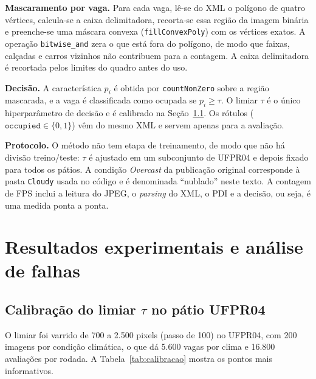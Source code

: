 \documentclass[
	article,			%
	11pt,				%
	oneside,			%
	a4paper,			%
	english,			%
	brazil,				%
	sumario=tradicional
	]{abntex2}
\begin{document}
\textbf{Mascaramento por vaga.} Para cada vaga, lê-se do XML o polígono de quatro vértices, calcula-se a caixa delimitadora, recorta-se essa região da imagem binária e preenche-se uma máscara convexa (\texttt{fillConvexPoly}) com os vértices exatos. A operação \texttt{bitwise\_and} zera o que está fora do polígono, de modo que faixas, calçadas e carros vizinhos não contribuem para a contagem. A caixa delimitadora é recortada pelos limites do quadro antes do uso.

\textbf{Decisão.} A característica $p_i$ é obtida por \texttt{countNonZero} sobre a região mascarada, e a vaga é classificada como ocupada se $p_i\ge\tau$. O limiar $\tau$ é o único hiperparâmetro de decisão e é calibrado na Seção~\ref{sec:calibracao}. Os rótulos ($\texttt{occupied}\in\{0,1\}$) vêm do mesmo XML e servem apenas para a avaliação.

\textbf{Protocolo.} O método não tem etapa de treinamento, de modo que não há divisão treino/teste: $\tau$ é ajustado em um subconjunto de UFPR04 e depois fixado para todos os pátios. A condição \textit{Overcast} da publicação original corresponde à pasta \texttt{Cloudy} usada no código e é denominada ``nublado'' neste texto. A contagem de FPS inclui a leitura do JPEG, o \textit{parsing} do XML, o PDI e a decisão, ou seja, é uma medida ponta a ponta.

\section{Resultados experimentais e análise de falhas}
\label{sec:resultados}

\subsection{Calibração do limiar \texorpdfstring{$\tau$}{tau} no pátio UFPR04}
\label{sec:calibracao}

O limiar foi varrido de 700 a 2.500 pixels (passo de 100) no UFPR04, com 200 imagens por condição climática, o que dá 5.600 vagas por clima e 16.800 avaliações por rodada. A Tabela~\ref{tab:calibracao} mostra os pontos mais informativos.
\end{document}
